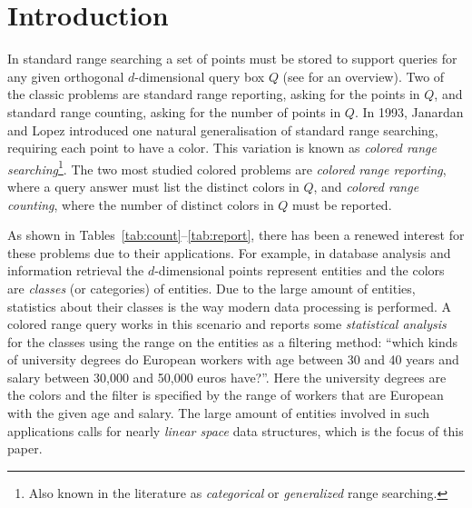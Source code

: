 
\section{Introduction}
\label{sec:introduction}
%
In standard range searching a set of points must be stored to support queries for any given orthogonal $d$-dimensional query box $Q$ (see \cite{de2008orthogonal} for an overview). Two of the classic problems are standard range reporting, asking for the points in $Q$, and standard range counting, asking for the number of points in $Q$. In 1993, Janardan and Lopez \cite{janardan1993generalized} introduced one natural generalisation of standard range searching, requiring each point to have a color. This variation is known as \emph{colored range searching}\footnote{Also known in the literature as \emph{categorical} or \emph{generalized} range searching.}. 
The two most studied colored problems are \emph{colored range reporting}, where a query answer must list the distinct colors in $Q$, and \emph{colored range counting}, where the number of distinct colors in $Q$ must be reported. 

As shown in Tables~\ref{tab:count}--\ref{tab:report}, there has been a renewed interest for these problems due to their applications. For example, in database analysis and information retrieval the $d$-dimensional points represent entities and the colors are \emph{classes} (or categories) of entities. Due to the large amount of entities, statistics about their classes is the way modern data processing is performed.  A colored range query works in this scenario and reports some \emph{statistical analysis} for the classes using the range on the entities as a filtering method: ``which kinds of university degrees do European workers with age between 30 and 40 years and salary between 30,000 and 50,000 euros have?''. Here the university degrees are the colors and the filter is specified by the range of workers that are European with the given age and salary. The large amount of entities involved in such applications calls for nearly \emph{linear space} data structures, which is the focus of this paper.

